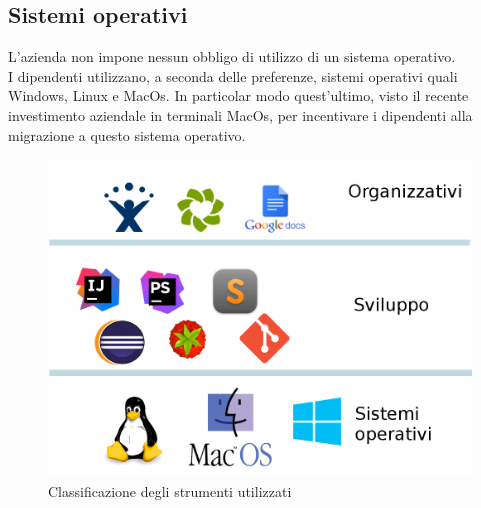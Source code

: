 \subsection{Sistemi operativi}
L'azienda non impone nessun obbligo di utilizzo di un sistema operativo.\\I dipendenti utilizzano, a seconda delle preferenze, sistemi operativi quali Windows, Linux e MacOs. In particolar modo quest'ultimo, visto il recente investimento aziendale in terminali MacOs, per incentivare i dipendenti alla migrazione a questo sistema operativo.
\begin{figure}[h]
\centering
\includegraphics[scale=0.25]{immagini/strumenti}
\caption{Classificazione degli strumenti utilizzati}
\label{fig:strumenti}
\end{figure}




